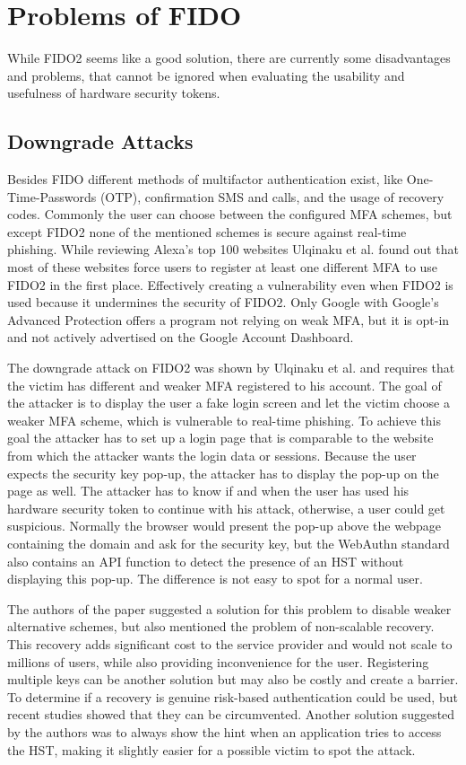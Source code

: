 \documentclass[runningheads]{llncs}
\begin{document}
\section{Problems of FIDO}
While FIDO2 seems like a good solution, there are currently some disadvantages and problems, that cannot be ignored when evaluating the usability and usefulness of hardware security tokens.

\subsection{Downgrade Attacks}
Besides FIDO different methods of multifactor authentication exist, like One-Time-Passwords (OTP), confirmation SMS and calls, and the usage of recovery codes. Commonly the user can choose between the configured MFA schemes, but except FIDO2 none of the mentioned schemes is secure against real-time phishing. While reviewing Alexa's top 100 websites Ulqinaku et al. found out that most of these websites force users to register at least one different MFA to use FIDO2 in the first place. Effectively creating a vulnerability even when FIDO2 is used because it undermines the security of FIDO2. Only Google with Google's Advanced Protection offers a program not relying on weak MFA, but it is opt-in and not actively advertised on the Google Account Dashboard.

The downgrade attack on FIDO2 was shown by Ulqinaku et al. and requires that the victim has different and weaker MFA registered to his account. The goal of the attacker is to display the user a fake login screen and let the victim choose a weaker MFA scheme, which is vulnerable to real-time phishing. To achieve this goal the attacker has to set up a login page that is comparable to the website from which the attacker wants the login data or sessions. Because the user expects the security key pop-up, the attacker has to display the pop-up on the page as well. The attacker has to know if and when the user has used his hardware security token to continue with his attack, otherwise, a user could get suspicious. Normally the browser would present the pop-up above the webpage containing the domain and ask for the security key, but the WebAuthn standard also contains an API function to detect the presence of an HST without displaying this pop-up. The difference is not easy to spot for a normal user.\cite{274610}

The authors of the paper suggested a solution for this problem to disable weaker alternative schemes, but also mentioned the problem of non-scalable recovery. This recovery adds significant cost to the service provider and would not scale to millions of users, while also providing inconvenience for the user. Registering multiple keys can be another solution but may also be costly and create a barrier. To determine if a recovery is genuine risk-based authentication could be used, but recent studies showed that they can be circumvented. Another solution suggested by the authors was to always show the hint when an application tries to access the HST, making it slightly easier for a possible victim to spot the attack.
\end{document}
